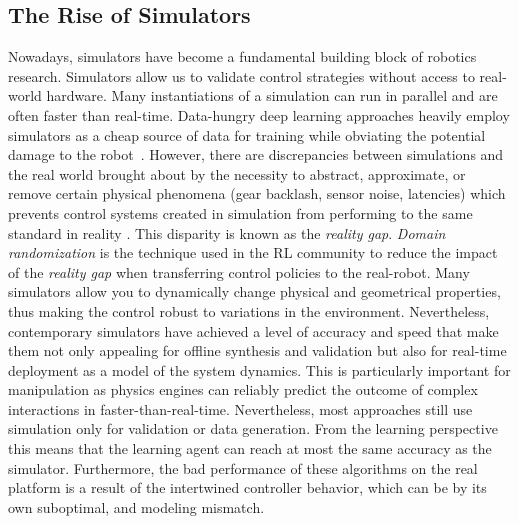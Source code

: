 \subsection{The Rise of Simulators}
Nowadays, simulators have become a fundamental building block of robotics research. Simulators allow us to validate control strategies without access to real-world hardware. Many instantiations of a simulation can run in parallel and are often faster than real-time. Data-hungry deep learning approaches heavily employ simulators as a cheap source of data for training while obviating the potential damage to the robot~\cite{liang_gpu-accelerated_2018}. However, there are discrepancies between simulations and the real world brought about by the necessity to abstract, approximate, or remove certain physical phenomena (gear backlash, sensor noise, latencies) which prevents control systems created in simulation from performing to the same standard in reality \cite{collins_benchmarking_2020}. This disparity is known as the \emph{reality gap}. \emph{Domain randomization} is the technique used in the RL community to reduce the impact of the \emph{reality gap} when transferring control policies to the real-robot. Many simulators allow you to dynamically change physical and geometrical properties, thus making the control robust to variations in the environment. Nevertheless, contemporary simulators have achieved a level of accuracy and speed that make them not only appealing for offline synthesis and validation but also for real-time deployment as a model of the system dynamics. This is particularly important for manipulation as physics engines can reliably predict the outcome of complex interactions in faster-than-real-time. Nevertheless, most approaches still use simulation only for validation or data generation. From the learning perspective this means that the learning agent can reach at most the same accuracy as the simulator. Furthermore, the bad performance of these algorithms on the real platform is a result of the intertwined controller behavior, which can be by its own suboptimal, and modeling mismatch.   

